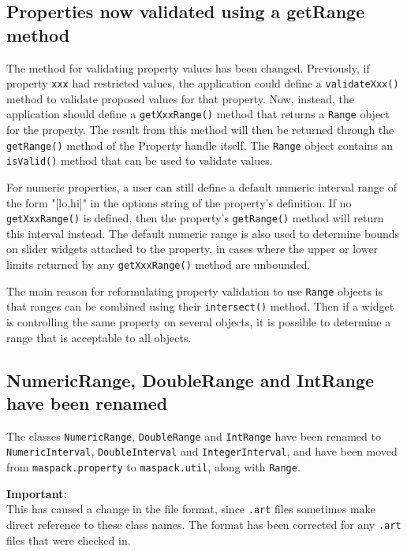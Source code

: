 \documentclass{article}
\begin{document}
\subsection*{Properties now validated using a getRange method}

The method for validating property values has been changed.
Previously, if property {\tt xxx} had restricted values, the application
could define a {\tt validateXxx()} method to validate proposed values for
that property. Now, instead, the application should define a
{\tt getXxxRange()} method that returns a {\tt Range} object for the
property. The result from this method will then be returned through
the {\tt getRange()} method of the Property handle itself.  The {\tt Range}
object contains an {\tt isValid()} method that can be used to validate
values.

For numeric properties, a user can still define a default numeric
interval range of the form "[lo,hi]" in the options string of the
property's definition. If no {\tt getXxxRange()} is defined, then the
property's {\tt getRange()} method will return this interval instead.  The
default numeric range is also used to determine bounds on slider
widgets attached to the property, in cases where the upper or lower
limits returned by any {\tt getXxxRange()} method are unbounded.

The main reason for reformulating property validation to use {\tt Range}
objects is that ranges can be combined using their {\tt intersect()}
method. Then if a widget is controlling the same property on several
objects, it is possible to determine a range that is acceptable to all
objects.

\subsection*{NumericRange, DoubleRange and IntRange have been renamed}

The classes {\tt NumericRange}, {\tt DoubleRange} and {\tt IntRange} have been
renamed to {\tt NumericInterval}, {\tt DoubleInterval} and {\tt IntegerInterval},
and have been moved from {\tt maspack.property} to
{\tt maspack.util}, along with {\tt Range}.

\begin{sideblock}
{\bf Important:}\\
This has caused a change in the file format, since {\tt .art}
files sometimes make direct reference to these class names. The format
has been corrected for any {\tt .art} files that were checked in.
\end{sideblock}
\end{document}
